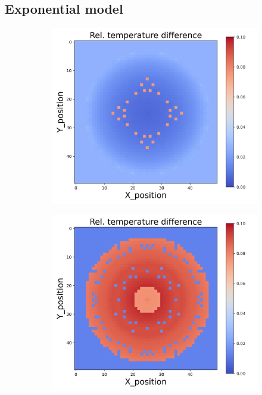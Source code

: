 \subsection{Exponential model}
\begin{figure}[h]
    \centering
    \begin{minipage}{\textwidth}
        \centering
        \begin{subfigure}{0.3\textwidth}
            \centering
            \includegraphics[width=\textwidth]{figures/raw_data/0/exp/T_bias.jpg}
        \end{subfigure}
        \begin{subfigure}{0.3\textwidth}
            \centering
            \includegraphics[width=\textwidth]{figures/raw_data/5/exp/T_bias.jpg}

\end{subfigure}
\end{minipage}
\end{figure}
